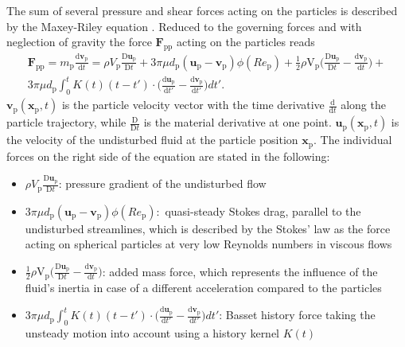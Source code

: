 \documentclass[11pt,a4paper,openany,oneside,parskip=half*]{article}
\renewcommand*\vec[1]{\boldsymbol{#1}}
\begin{document}
The sum of several pressure and shear forces acting on the particles is described by the Maxey-Riley equation \cite{EquationOfMotionForASmallRigidSphereInANonuniformFlow}.
Reduced to the governing forces and with neglection of gravity the force $\vec{F}_\mathrm{pp}$ acting on the particles reads
\begin{multline} \label{navier_stokes_particle}
 \vec{F}_\mathrm{pp} = m_\mathrm{p} \frac{\mathrm{d}\vec{v}_\mathrm{p}}{\mathrm{d}t} =\rho V_\mathrm{p}\frac{\mathrm{D}\vec{u}_\mathrm{p}}{\mathrm{D}t} + 3 \pi \mu d_\mathrm{p}(\vec{u}_\mathrm{p}-\vec{v}_\mathrm{p})\phi(Re_\mathrm{p})+ \frac{1}{2}\rho \mathrm{V}_\mathrm{p} \biggl(\frac{\mathrm{D}\vec{u}_\mathrm{p}}{\mathrm{D}t}-\frac{\mathrm{d}\vec{v}_\mathrm{p}}{\mathrm{d}t}\biggl) +
\\ 3 \pi \mu d_\mathrm{p}\int_{0}^{t} K(t) (t-t') \cdot \biggl(\frac{\mathrm{d}\vec{u}_\mathrm{p}}{\mathrm{d}t'}- \frac{\mathrm{d}\vec{v}_\mathrm{p}}{\mathrm{d}t'}\biggl)dt'.
\end{multline}
$\vec{v}_\mathrm{p}(\vec{x}_\mathrm{p},t)$ is the particle velocity vector with the time derivative $\frac{\mathrm{d}}{\mathrm{d}t}$ along the particle trajectory, while $\frac{\mathrm{D}}{\mathrm{D}t}$  is the material derivative at one point. $\vec{u}_\mathrm{p}(\vec{x}_\mathrm{p},t)$ is the velocity of the undisturbed fluid at the particle position $\vec{x}_\mathrm{p}$.
The individual forces on the right side of the equation are stated in the following:
\begin{itemize} 
\item  $\rho V_\mathrm{p}\frac{\mathrm{D}\vec{u}_\mathrm{p}}{\mathrm{D}t}$: \newline
pressure gradient of the undisturbed flow
\item $3 \pi \mu d_\mathrm{p}(\vec{u}_\mathrm{p}-\vec{v}_\mathrm{p})\phi(Re_\mathrm{p}):$\newline
quasi-steady Stokes drag, parallel to the undisturbed streamlines, which is described by the Stokes' law as the force acting on spherical particles at very low Reynolds numbers in viscous flows

\item $\frac{1}{2}\rho \mathrm{V}_\mathrm{p} \biggl(\frac{\mathrm{D}\vec{u}_\mathrm{p}}{\mathrm{D}t}-\frac{\mathrm{d}\vec{v}_\mathrm{p}}{\mathrm{d}t}\biggl)$:
\newline
added mass force, which represents the influence of the fluid's inertia in case of a different acceleration compared to the particles
\item $3 \pi \mu d_\mathrm{p}\int_{0}^{t} K(t) (t-t') \cdot \biggl(\frac{\mathrm{d}\vec{u}_\mathrm{p}}{\mathrm{d}t'}- \frac{\mathrm{d}\vec{v}_\mathrm{p}}{\mathrm{d}t'}\biggl)dt'$: \newline
Basset history force taking the unsteady motion into account using a history kernel $K(t)$ 
\end{itemize}
\end{document}
